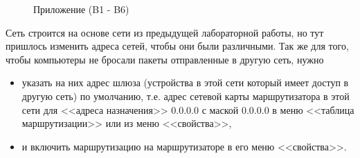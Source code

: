 \begin{figure}[b]
    \centering
    \caption{Приложение (B1 - B6)}
    \label{fig:application}
\end{figure}

\newpage
{}


Сеть строится на основе сети из предыдущей лабораторной работы, но тут пришлось изменить адреса сетей, чтобы они были различными. Так же для того, чтобы компьютеры не бросали пакеты отправленные в другую сеть, нужно 
\begin{itemize}
    \item указать на них адрес шлюза (устройства в этой сети который имеет доступ в другую сеть) по умолчанию, т.е. адрес сетевой карты маршрутизатора в этой сети для <<адреса назначения>> 0.0.0.0  с маской 0.0.0.0 в меню <<таблица маршрутизации>> или из меню <<свойства>>,
    \item и включить маршрутизацию на маршрутизаторе в его меню <<свойства>>.
\end{itemize}

